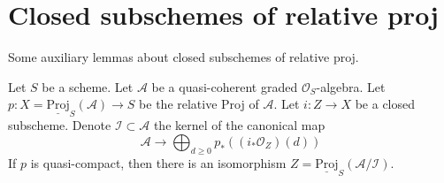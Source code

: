 \section{Closed subschemes of relative proj}
\label{section-closed-in-relative-proj}

\noindent
Some auxiliary lemmas about closed subschemes of relative proj.

\begin{lemma}
\label{lemma-closed-subscheme-proj}
Let $S$ be a scheme. Let $\mathcal{A}$ be a quasi-coherent graded
$\mathcal{O}_S$-algebra. Let
$p : X = \underline{\text{Proj}}_S(\mathcal{A}) \to S$ be the relative
Proj of $\mathcal{A}$. Let $i : Z \to X$ be a closed subscheme. Denote
$\mathcal{I} \subset \mathcal{A}$ the kernel of the canonical map
$$
\mathcal{A}
\longrightarrow
\bigoplus\nolimits_{d \geq 0} p_*\left((i_*\mathcal{O}_Z)(d)\right)
$$
If $p$ is quasi-compact, then there is an isomorphism
$Z = \underline{\text{Proj}}_S(\mathcal{A}/\mathcal{I})$.
\end{lemma}

